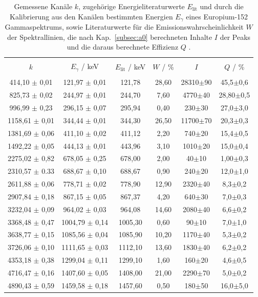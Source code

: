 \begin{table}
\centering
\caption{Gemessene Kanäle $k$, zugehörige Energieliteraturwerte $E_{\text{lit}}$ und durch die Kalibrierung aus den Kanälen bestimmten Energien $E_{\gamma}$ eines Europium-152 Gammaspektrums, sowie Literaturwerte für die Emissionswahrscheinlichkeit $W$ der Spektrallinien, die nach Kap.~\ref{subsec:a0} berechneten Inhalte $I$ der Peaks und die daraus berechnete Effizienz $Q$ \cite{sample}.}
\begin{tabular}{c c c c c c}
\hline \\
$k$ &$E_{\gamma}$ / keV & $E_{\text{lit}}$ / keV &  $W$ / \% & $I$ & $Q$ / \% \\
\hline \\
414,10 $\pm$ 0,01 & 121,97 $\pm$ 0,01 & 121,78 & 28,60 & 28310$\pm$90 & 45,5$\pm$0,6 \\
825,73 $\pm$ 0,02 & 244,97 $\pm$ 0,01 & 244,70 & 7,60 & 4770$\pm$40 & 28,80$\pm$0,5 \\
996,99 $\pm$ 0,23 & 296,15 $\pm$ 0,07 & 295,94 & 0,40 & 230$\pm$30 & 27,0$\pm$3,0 \\
1158,61 $\pm$ 0,01 & 344,44 $\pm$ 0,01 & 344,30 & 26,50 & 11700$\pm$70 & 20,3$\pm$0,3 \\
1381,69 $\pm$ 0,06 & 411,10 $\pm$ 0,02 & 411,12 & 2,20 & 740$\pm$20 & 15,4$\pm$0,5 \\
1492,22 $\pm$ 0,05 & 444,13 $\pm$ 0,01 & 443,96 & 3,10 & 1010$\pm$20 & 15,0$\pm$0,4 \\
2275,02 $\pm$ 0,82 & 678,05 $\pm$ 0,25 & 678,00 & 2,00 & 40$\pm$10 & 1,00$\pm$0,3 \\
2310,57 $\pm$ 0.33 & 688,67 $\pm$ 0,10 & 688,67 & 0,90 & 240$\pm$20 & 12,0$\pm$1,0 \\
2611,88 $\pm$ 0,06 & 778,71 $\pm$ 0,02 & 778,90 & 12,90 & 2320$\pm$40 & 8,3$\pm$0,2 \\
2907,84 $\pm$ 0,18 & 867,15 $\pm$ 0,05 & 867,37 & 4,20 & 640$\pm$30 & 7,0$\pm$0,3 \\
3232,04 $\pm$ 0,09 & 964,02 $\pm$ 0,03 & 964,08 & 14,60 & 2080$\pm$40 & 6,6$\pm$0,2 \\
3368,48 $\pm$ 0,47 & 1004,79 $\pm$ 0,14 & 1005,30 & 0,60 & 90$\pm$10 & 7,0$\pm$1,0 \\
3638,77 $\pm$ 0,15 & 1085,56 $\pm$ 0,04 & 1085,90 & 10,20 & 1170$\pm$40 & 5,3$\pm$0,2 \\
3726,06 $\pm$ 0,10 & 1111,65 $\pm$ 0,03 & 1112,10 & 13,60 & 1830$\pm$40 & 6,2$\pm$0,2 \\
4353,18 $\pm$ 0,38 & 1299,04 $\pm$ 0,11 & 1299,10 & 1,60 & 160$\pm$20 & 4,6$\pm$0,5 \\
4716,47 $\pm$ 0,16 & 1407,60 $\pm$ 0,05 & 1408,00 & 21,00 & 2290$\pm$70 & 5,0$\pm$0,2 \\
4890,43 $\pm$ 0,59 & 1459,58 $\pm$ 0,18 & 1457,60 & 0,50 & 180$\pm$50 & 16,0$\pm$5,0\\
\hline
\end{tabular}
\label{tab:atab1}
\end{table}
